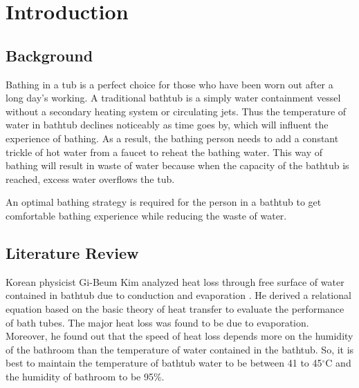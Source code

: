 \documentclass{mcmthesis}
\renewcommand{\contentsname}{\hspace*{\fill}\Large\bfseries Contents \hspace*{\fill}}
\begin{document}
\maketitle

\tableofcontents        %
\thispagestyle{empty}

\newpage

\section{Introduction}

\subsection{Background}

Bathing in a tub is a perfect choice for those who have been worn out after a long day's working. A traditional bathtub is a simply water containment vessel without a secondary heating system or circulating jets. Thus the temperature of water in bathtub declines noticeably as time goes by, which will influent the experience of bathing. As a result, the bathing person needs to add a constant trickle of hot water from a faucet to reheat the bathing water. This way of bathing will result in waste of water because when the capacity of the bathtub is reached, excess water overflows the tub.

An optimal bathing strategy is required for the person in a bathtub to get comfortable bathing experience while reducing the waste of water.

\subsection{Literature Review}

Korean physicist Gi-Beum Kim analyzed heat loss through free surface of water contained in bathtub due to conduction and evaporation . He derived a relational equation based on the basic theory of heat transfer to evaluate the performance of bath tubes. The major heat loss was found to be due to evaporation. Moreover, he found out that the speed of heat loss depends more on the humidity of the bathroom than the temperature of water contained in the bathtub. So, it is best to maintain the temperature of bathtub water to be between 41 to 45$^{\circ}$C and the humidity of bathroom to be 95\%.
\end{document}
